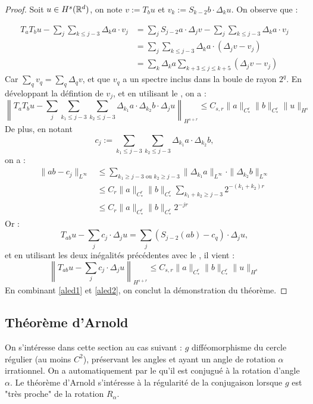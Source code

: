 \documentclass[11pt,a4paper]{article}
\begin{document}
\begin{proof}
Soit $u\in H^s(\mathbb R^d)$, on note $v:=T_bu$ et $v_k:=S_{k-2}b\cdot\Delta_ku$. On observe que :

\begin{align*}
T_aT_bu - \sum_j \sum_{k \leq j-3} \Delta_ka\cdot v_j &= \sum_j S_{j-2}a\cdot\Delta_jv - \sum_j \sum_{k \leq j-3} \Delta_ka\cdot v_j \\
&=\sum_j \sum_{k \leq j-3} \Delta_ka\cdot (\Delta_jv - v_j) \\
&=\sum_k \Delta_ka \sum_{k+3 \leq j \leq k+5} (\Delta_jv - v_j) 
\end{align*}
Car $\sum_qv_q=\sum_q\Delta_qv$, et que $v_q$ a un spectre inclus dans la boule de rayon $2^q$. En développant la défintion de $v_j$, et en utilisant le , on a :
\begin{equation}\label{aled1}
\left\| T_aT_bu - \sum_j \sum_{k_1 \leq j-3} \sum_{k_2\leq j-3} \Delta_{k_1}a\cdot \Delta_{k_2}b \cdot \Delta_j u \right\|_{H^{s+r}} \leq C_{s,r} \|a\|_{C^r_*} \|b\|_{C^r_*} \|u\|_{H^s}
\end{equation}
De plus, en notant 
\begin{equation*}
c_j := \sum_{k_1 \leq j-3}\sum_{k_2 \leq j-3}\Delta_{k_1}a \cdot \Delta_{k_2}b,
\end{equation*}
on a :
\begin{align*}
\|ab-c_j\|_{L^\infty} &\leq \sum_{k_1\geq j-3 \text{ ou } k_2 \geq j-3}\|\Delta_{k_1}a\|_{L^\infty} \cdot \|\Delta_{k_2}b\|_{L^\infty} \\
&\leq C_r \|a\|_{C^r_*} \|b\|_{C^r_*} \sum_{k_1+k_2 \geq j-3} 2^{-(k_1+k_2)r} \\
&\leq C_r \|a\|_{C^r_*} \|b\|_{C^r_*}  2^{-jr} 
\end{align*}
Or :
\begin{equation*}
T_{ab}u-\sum_jc_j \cdot \Delta_ju = \sum_j(S_{j-2}(ab) - c_q) \cdot \Delta_ju,
\end{equation*}
et en utilisant les deux inégalités précédentes avec le , il vient :
\begin{equation}\label{aled2}
\left\| T_{ab}u-\sum_jc_j\cdot \Delta_ju \right\|_{H^{s+r}} \leq C_{s,r} \|a\|_{C^r_*} \|b\|_{C^r_*} \|u\|_{H^s}
\end{equation}
En combinant \eqref{aled1} et \eqref{aled2}, on conclut la démonstration du théorème.
\end{proof}

\subsection{Théorème d'Arnold}
On s'intéresse dans cette section au cas suivant : $g$ difféomorphisme du cercle régulier (au moins $C^2$), préservant les angles et ayant un angle de rotation $\alpha$ irrationnel. On a automatiquement par le  qu'il est conjugué à la rotation d'angle $\alpha$. Le théorème d'Arnold s'intéresse à la régularité de la conjugaison lorsque $g$ est "très proche" de la rotation $R_\alpha$.
\end{document}
